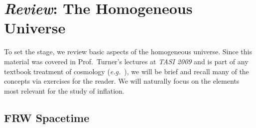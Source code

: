 \documentclass[12pt,letterpaper,rotate]{article}
\begin{document}
{ 
\section{{\sl Review}: The Homogeneous Universe}
\label{sec:FRW}

To set the stage, we review basic aspects of the homogeneous universe.
Since this material was covered in Prof.~Turner's lectures at {\sl TASI 2009} and is part of any textbook treatment of cosmology ({\it e.g.}~\cite{Dodelson, Mukhanov, WeinbergCosmology}), we will be brief and recall many of the concepts via exercises for the reader. 
We will naturally focus on the elements most relevant for the study of inflation.

\subsection{FRW Spacetime}

}
\end{document}
